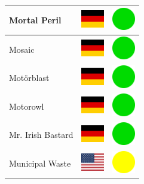 \documentclass[12pt, a4paper, twoside]{report}
\begin{document}
\begin{center}
\begin{longtable}{|p{5cm}|p{2cm}|p{2cm}|}
 Mortal Peril                                               & \includegraphics[width=1cm]{4x3/de} &   \includegraphics[width=1cm]{likes/y} \\ \hline
 Mosaic                                                     & \includegraphics[width=1cm]{4x3/de} &   \includegraphics[width=1cm]{likes/y} \\ \hline
 Motörblast                                                 & \includegraphics[width=1cm]{4x3/de} &   \includegraphics[width=1cm]{likes/y} \\ \hline
 Motorowl                                                   & \includegraphics[width=1cm]{4x3/de} &   \includegraphics[width=1cm]{likes/y} \\ \hline
 Mr. Irish Bastard                                          & \includegraphics[width=1cm]{4x3/de} &   \includegraphics[width=1cm]{likes/y} \\ \hline
 Municipal Waste                                            & \includegraphics[width=1cm]{4x3/us} &   \includegraphics[width=1cm]{likes/m} \\ \hline

\end{longtable}
\end{center}
\end{document}
